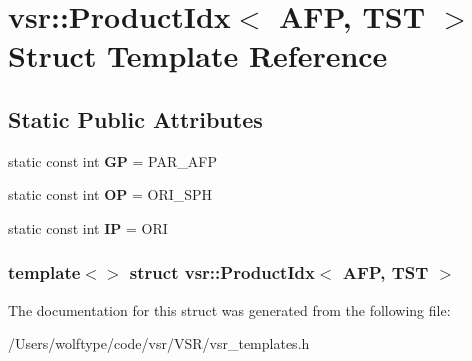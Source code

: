\hypertarget{structvsr_1_1_product_idx_3_01_a_f_p_00_01_t_s_t_01_4}{\section{vsr\-:\-:Product\-Idx$<$ A\-F\-P, T\-S\-T $>$ Struct Template Reference}
\label{structvsr_1_1_product_idx_3_01_a_f_p_00_01_t_s_t_01_4}
}
\subsection*{Static Public Attributes}
\begin{DoxyCompactItemize}
\item 
\hypertarget{structvsr_1_1_product_idx_3_01_a_f_p_00_01_t_s_t_01_4_ac528197c99ad240ad12d551313f137f7}{static const int {\bfseries G\-P} = P\-A\-R\-\_\-\-A\-F\-P}\label{structvsr_1_1_product_idx_3_01_a_f_p_00_01_t_s_t_01_4_ac528197c99ad240ad12d551313f137f7}

\item 
\hypertarget{structvsr_1_1_product_idx_3_01_a_f_p_00_01_t_s_t_01_4_a56ceb8915d6877a36de52159aa571d81}{static const int {\bfseries O\-P} = O\-R\-I\-\_\-\-S\-P\-H}\label{structvsr_1_1_product_idx_3_01_a_f_p_00_01_t_s_t_01_4_a56ceb8915d6877a36de52159aa571d81}

\item 
\hypertarget{structvsr_1_1_product_idx_3_01_a_f_p_00_01_t_s_t_01_4_adcf407f76da6da701eef3d6f5499f0f1}{static const int {\bfseries I\-P} = O\-R\-I}\label{structvsr_1_1_product_idx_3_01_a_f_p_00_01_t_s_t_01_4_adcf407f76da6da701eef3d6f5499f0f1}

\end{DoxyCompactItemize}
\subsubsection*{template$<$$>$ struct vsr\-::\-Product\-Idx$<$ A\-F\-P, T\-S\-T $>$}



The documentation for this struct was generated from the following file\-:\begin{DoxyCompactItemize}
\item 
/\-Users/wolftype/code/vsr/\-V\-S\-R/vsr\-\_\-templates.\-h\end{DoxyCompactItemize}
